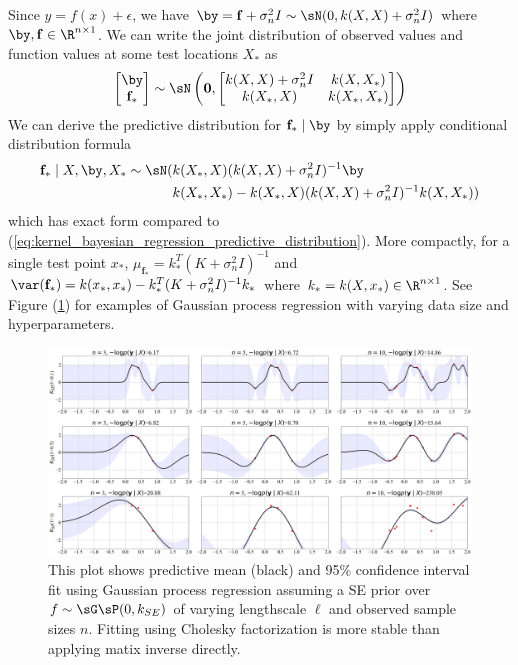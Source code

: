 \documentclass[11pt]{article}
\begin{document}
Since $y=f(x)+\epsilon$, we have $\by = \mathbf{f} + \sigma_n^2 I \sim \sN(0, k(X,X)+\sigma_n^2I)$ where $\by,\mathbf{f}\in\R^{n\times 1}$. We can write the joint distribution of observed values and function values at some test locations $X_*$ as
\begin{align}
    \begin{bmatrix}
        \by \\ \mathbf{f}_*
    \end{bmatrix}
    \sim
    \sN\left(
        \mathbf{0},
        \begin{bmatrix}
            k(X,X) + \sigma_n^2I & k(X,X_*) \\
            k(X_*,X) & k(X_*,X_*) \\ 
        \end{bmatrix}
    \right)
    \label{eq:gaussian_process_regression_noisy_model}
\end{align}
We can derive the predictive distribution for $\mathbf{f}_*\mid \by$ by simply apply conditional distribution formula
\begin{align}
    \mathbf{f}_* \mid X,\by, X_* \sim \sN(
        & k(X_*,X) (k(X,X)+\sigma_n^2 I)^{-1} \by  \\
        & k(X_*,X_*) - k(X_*,X) (k(X,X)+\sigma_n^2 I)^{-1} k(X,X_*) )
    \label{eq:gp_regression_predictive_distribution}
\end{align}
which has exact form compared to (\ref{eq:kernel_bayesian_regression_predictive_distribution}). More compactly, for a single test point $x_*$, $\mu_{\mathbf{f}_*} =  k_*^T (K+\sigma_n^2 I)^{-1}$ and $\var(\mathbf{f}_*) = k(x_*,x_*) - k_*^T (K+\sigma_n^2 I)^{-1} k_* $ where $k_* = k(X,x_*)\in \R^{n\times 1}$. See Figure (\ref{fig:plt_gp_regression_vary_trainsize}) for examples of Gaussian process regression with varying data size and hyperparameters. 


\begin{center} 
\begin{figure}[h!]
    \includegraphics[width=\textwidth]{assets/plt_gp_regression_vary_trainsize.png} 
    \caption{This plot shows predictive mean (black) and 95\% confidence interval fit using Gaussian process regression assuming a SE prior over $f\sim\sG\sP(0,k_{SE})$ of varying lengthscale $\ell$ and observed sample sizes $n$. Fitting using Cholesky factorization is more stable than applying matix inverse directly.}
    \label{fig:plt_gp_regression_vary_trainsize}
\end{figure}
\end{center}
\end{document}
